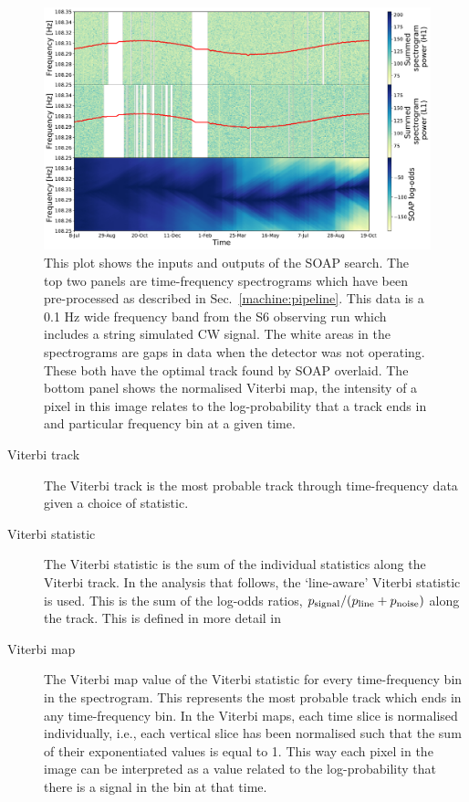 \begin{figure}[h]
	\includegraphics[scale=0.43]{C4_cnn/two_vit_example.pdf}
	\caption[Example SOAP output from H1 and L1 input spectrograms. ]{\label{soap:viterbiplot} This plot shows the inputs and outputs of the
		SOAP search. The top two panels are time-frequency spectrograms which have been pre-processed as described in Sec.~\ref{machine:pipeline}. This
		data is a 0.1 Hz wide frequency band from the S6 observing run \cite{}  which includes a string simulated \gls{CW} signal. The white areas in the spectrograms are gaps in data when the detector was not operating. These both have the
		optimal track found by SOAP overlaid. The bottom panel shows the normalised Viterbi map, the intensity of a
		pixel in this image relates to the log-probability that a track ends in and
		particular frequency bin at a given time.}
\end{figure}

%
\begin{description} 
	\item [Viterbi track] The Viterbi track is the most probable track through time-frequency data given a choice of statistic. 
	\item [Viterbi statistic] The Viterbi statistic is the sum of the individual statistics along the Viterbi track. In the analysis that follows, the `line-aware' Viterbi statistic is used. 
	This is the sum of the log-odds ratios, $p_{\rm signal}/(p_{\rm line} + p_{\rm noise})$ along the track. This is defined in more detail in \cite{bayley2019SOAPGeneralised}
	\item [Viterbi map]
	The Viterbi map value of the Viterbi statistic for every time-frequency bin in the spectrogram. 
	This represents the most probable track which ends in any time-frequency bin.
	In the Viterbi maps, each time slice is normalised individually, i.e., each
	vertical slice has been normalised such that the sum of their exponentiated
	values is equal to 1. This way each pixel in the image can be interpreted as a
	value related to the log-probability that there is a signal in the bin at that
	time.
\end{description}

